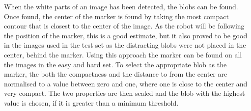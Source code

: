When the white parts of an image has been detected, the blobs can be found.
Once found, the center of the marker is found by taking the most compact contour that is closest to the center of the image.
As the robot will be following the position of the marker, this is a good estimate, but it also proved to be good in the images used in the test set as the distracting blobs were not placed in the center, behind the marker.
Using this approach the marker can be found on all the images in the easy and hard set.
To select the appropriate blob as the marker, the both the compactness and the distance to from the center are normalised to a value between zero and one, where one is close to the center and very compact.
The two properties are then scaled and the blob with the highest value is chosen, if it is greater than a minimum threshold.

